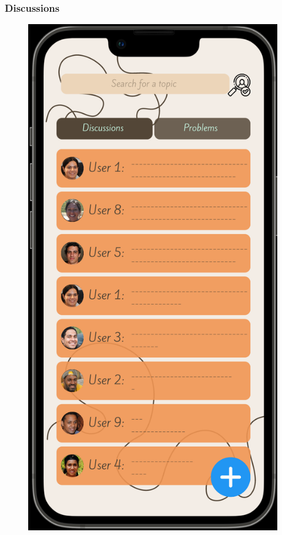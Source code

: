 \subsubsection{Discussions}
    \begin{figure}[ht]
        \centering
        \includegraphics[width = 0.5\linewidth]{figures/discussions.png}
        \label{fig:profile}
    \end{figure}

